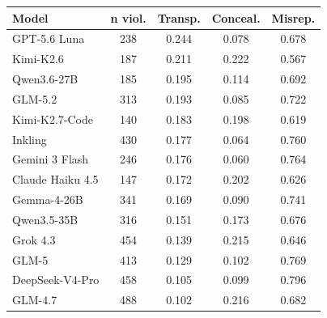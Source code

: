 \begin{tabular}{@{}l c c c c@{}}
\toprule
\textbf{Model} & \textbf{n viol.} & \textbf{Transp.} & \textbf{Conceal.} & \textbf{Misrep.} \\
\midrule
GPT-5.6 Luna & 238 & \cellcolor[HTML]{8CC896} 0.244 & \cellcolor[HTML]{9DCA93} 0.078 & \cellcolor[HTML]{D3D288} 0.678 \\
Kimi-K2.6 & 187 & \cellcolor[HTML]{ABCC90} 0.211 & \cellcolor[HTML]{E6AB86} 0.222 & \cellcolor[HTML]{8CC896} 0.567 \\
Qwen3.6-27B & 185 & \cellcolor[HTML]{BACF8D} 0.195 & \cellcolor[HTML]{BFCF8C} 0.114 & \cellcolor[HTML]{DCD386} 0.692 \\
GLM-5.2 & 313 & \cellcolor[HTML]{BCCF8C} 0.193 & \cellcolor[HTML]{A4CB91} 0.085 & \cellcolor[HTML]{EFD682} 0.722 \\
Kimi-K2.7-Code & 140 & \cellcolor[HTML]{C6D08A} 0.183 & \cellcolor[HTML]{EBBD84} 0.198 & \cellcolor[HTML]{ADCD8F} 0.619 \\
Inkling & 430 & \cellcolor[HTML]{CCD189} 0.177 & \cellcolor[HTML]{90C995} 0.064 & \cellcolor[HTML]{ECC384} 0.760 \\
Gemini 3 Flash & 246 & \cellcolor[HTML]{CCD189} 0.176 & \cellcolor[HTML]{8CC896} 0.060 & \cellcolor[HTML]{EBC184} 0.764 \\
Claude Haiku 4.5 & 147 & \cellcolor[HTML]{D0D288} 0.172 & \cellcolor[HTML]{EABA85} 0.202 & \cellcolor[HTML]{B2CD8E} 0.626 \\
Gemma-4-26B & 341 & \cellcolor[HTML]{D3D288} 0.169 & \cellcolor[HTML]{A8CC90} 0.090 & \cellcolor[HTML]{EECD83} 0.741 \\
Qwen3.5-35B & 316 & \cellcolor[HTML]{E4D484} 0.151 & \cellcolor[HTML]{EFD183} 0.173 & \cellcolor[HTML]{D1D288} 0.676 \\
Grok 4.3 & 454 & \cellcolor[HTML]{F0D682} 0.139 & \cellcolor[HTML]{E8B086} 0.215 & \cellcolor[HTML]{BECF8C} 0.646 \\
GLM-5 & 413 & \cellcolor[HTML]{EECF83} 0.129 & \cellcolor[HTML]{B4CE8E} 0.102 & \cellcolor[HTML]{EBBE84} 0.769 \\
DeepSeek-V4-Pro & 458 & \cellcolor[HTML]{EABC85} 0.105 & \cellcolor[HTML]{B1CD8F} 0.099 & \cellcolor[HTML]{E8B086} 0.796 \\
GLM-4.7 & 488 & \cellcolor[HTML]{EABA85} 0.102 & \cellcolor[HTML]{E8AF86} 0.216 & \cellcolor[HTML]{D5D287} 0.682 \\

\end{tabular}
